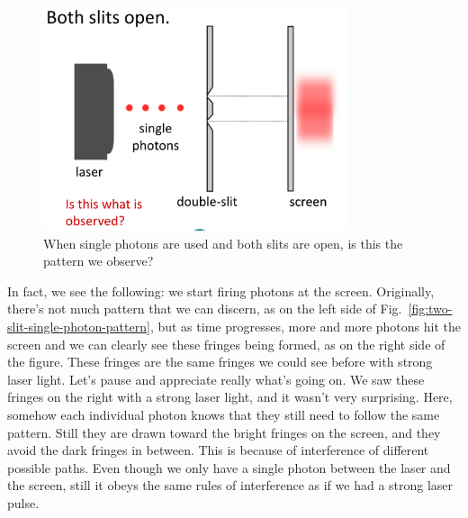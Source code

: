 \begin{figure}[H]
   \centering
    \includegraphics[width=0.8\textwidth]{lesson6/block_neither.pdf}
    
        \caption{When single photons are used and both slits are open, is this the pattern we observe?}
    \label{fig:two-slit-single-photon-wrong}
    
\end{figure}

In fact, we see the following: we start firing photons at the screen. Originally, there's not much pattern that we can discern, as on the left side of Fig.~\ref{fig:two-slit-single-photon-pattern}, but as time progresses, more and more photons hit the screen and we can clearly see these fringes being formed, as on the right side of the figure. These fringes are the same fringes we could see before with strong laser light. Let's pause and appreciate really what's going on. We saw these fringes on the right with a strong laser light, and it wasn't very surprising. Here, somehow each individual photon knows that they still need to follow the same pattern. Still they are drawn toward the bright fringes on the screen, and they avoid the dark fringes in between. This is because of interference of different possible paths. Even though we only have a single photon between the laser and the screen, still it obeys the same rules of interference as if we had a strong laser pulse.


